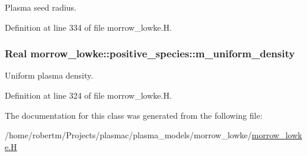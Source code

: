 Plasma seed radius. 



Definition at line 334 of file morrow\+\_\+lowke.\+H.

\subsubsection[{\texorpdfstring{m\+\_\+uniform\+\_\+density}{m_uniform_density}}]{\setlength{\rightskip}{0pt plus 5cm}Real morrow\+\_\+lowke\+::positive\+\_\+species\+::m\+\_\+uniform\+\_\+density}\hypertarget{classmorrow__lowke_1_1positive__species_aa02c6a49ac107957cca2553209502e6c}{}\label{classmorrow__lowke_1_1positive__species_aa02c6a49ac107957cca2553209502e6c}


Uniform plasma density. 



Definition at line 324 of file morrow\+\_\+lowke.\+H.



The documentation for this class was generated from the following file\+:\begin{DoxyCompactItemize}
\item 
/home/robertm/\+Projects/plasmac/plasma\+\_\+models/morrow\+\_\+lowke/\hyperlink{morrow__lowke_8H}{morrow\+\_\+lowke.\+H}\end{DoxyCompactItemize}
